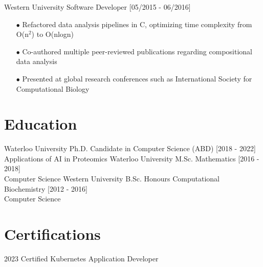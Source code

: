 \documentclass[]{twentysecondcv}
\begin{document}
\begin{twenty}
\twentyitem
    {Western University}
    {Software Developer}
    {[05/2015 - 06/2016]}
    {
    \begin{itemize}
        \item[$\bullet$] Refactored data analysis pipelines in C, optimizing time complexity from O(n$^2$) to O(nlogn) 
        \item[$\bullet$] Co-authored multiple peer-reviewed publications regarding compositional data analysis
        \item[$\bullet$]Presented at global research conferences such as International Society for Computational Biology
    \end{itemize}
}

\end{twenty}





\section{Education}
\vspace{-5px}
\begin{twenty}
  \twentyitem
    {Waterloo University}
    {Ph.D. {\normalfont Candidate in Computer Science} (ABD)}
    {[2018 - 2022]}
    {\\ Applications of AI in Proteomics}
  \twentyitem
    {Waterloo University}
    {M.Sc. Mathematics}
    {[2016 - 2018]}
    {\\Computer Science}
  \twentyitem
    {Western University}
    {B.Sc. Honours Computational Biochemistry}
    {[2012 - 2016]}
    {\\Computer Science}
\end{twenty}


\section{Certifications}
\vspace{-5px}

\begin{twentyshort}
  \twentyitemshort
    {2023}
    {Certified Kubernetes Application Developer}
\end{twentyshort}


\end{document}
